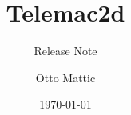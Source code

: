 \documentclass[Telemac2D]{../../data/TelemacDoc} %
\begin{document}
\let\cleardoublepage\clearpage

\title{Telemac2d}
\subtitle{Release Note}
\author{Otto Mattic}
\date{\today}
\maketitle
\clearpage



\newpage

\thispagestyle{empty}

\TelemacCopyright{}




\pagestyle{empty} %

\tableofcontents%


\pagestyle{fancy} %



\nocite{*}

\end{document}
